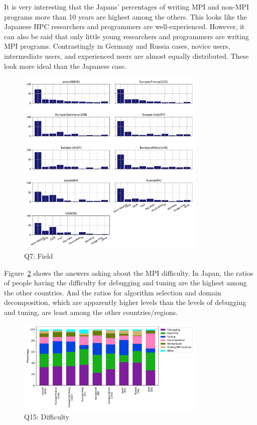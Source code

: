 \documentclass[submit,techrep,noauthor,english]{ipsj}
\begin{document}
It is very interesting that the Japans' percentages of writing MPI and
non-MPI programs more than 10 years are highest among the
others. This looks like the Japanese HPC researchers and programmers
are well-experienced. However, it can also be said that only little young
researchers and programmers are writing MPI programs. Contrastingly
in Germany and Russia cases, novice users, intermediate users, and
experienced users are almost equally distributed.  These look more
ideal than the Japanese case.

\begin{figure}[htb]
\begin{center}
\includegraphics[width=9cm]{../pdfs/Q7.pdf}
  \vspace{-8mm}
\caption{Q7: Field}
\label{fig:q7}
\end{center}
\end{figure}

Figure~\ref{fig:q15} shows the answers asking about the MPI
difficulty. In Japan, the ratios of people having the difficulty for
debugging and tuning are the highest among the other countries. And
the ratios for algorithm selection and domain decomposition, which
are apparently higher levels than the levels of debugging and tuning,
are least among the other countries/regions.

\begin{figure}[htb]
\begin{center}
\includegraphics[width=9cm]{../pdfs/Q15.pdf}
  \vspace{-8mm}
\caption{Q15: Difficulty}
\label{fig:q15}
\end{center}
\end{figure}
\end{document}
